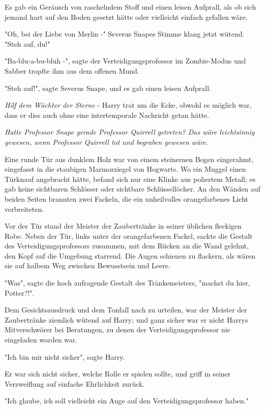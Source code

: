 {Es gab ein Geräusch von raschelndem Stoff und einen leisen Aufprall, als ob sich jemand hart auf den Boden gesetzt hätte oder vielleicht einfach gefallen wäre.

"Oh, bei der Liebe von Merlin -" Severus Snapes Stimme klang jetzt wütend. "Steh auf, du!"

"Ba-blu-a-bu-bluh -", sagte der Verteidigungsprofessor im Zombie-Modus und Sabber tropfte ihm aus dem offenen Mund.

"Steh auf!", sagte Severus Snape, und es gab einen leisen Aufprall.

\emph{Hilf dem Wächter der Sterne} - Harry trat um die Ecke, obwohl es möglich war, dass er dies auch ohne eine intertemporale Nachricht getan hätte.

\emph{Hatte Professor Snape gerade Professor Quirrell getreten? Das wäre leichtsinnig gewesen, wenn Professor Quirrell tot und begraben gewesen wäre.}

Eine runde Tür aus dunklem Holz war von einem steinernen Bogen eingerahmt, eingefasst in die staubigen Marmorziegel von Hogwarts. Wo ein Muggel einen Türknauf angebracht hätte, befand sich nur eine Klinke aus poliertem Metall; es gab keine sichtbaren Schlösser oder sichtbare Schlüssellöcher. An den Wänden auf beiden Seiten brannten zwei Fackeln, die ein unheilvolles orangefarbenes Licht verbreiteten.

Vor der Tür stand der Meister der Zaubertränke in seiner üblichen fleckigen Robe. Neben der Tür, links unter der orangefarbenen Fackel, sackte die Gestalt des Verteidigungsprofessors zusammen, mit dem Rücken an die Wand gelehnt, den Kopf auf die Umgebung starrend. Die Augen schienen zu flackern, als wären sie auf halbem Weg zwischen Bewusstsein und Leere.

"Was", sagte die hoch aufragende Gestalt des Tränkemeisters, "machst du hier, Potter?!".

Dem Gesichtsausdruck und dem Tonfall nach zu urteilen, war der Meister der Zaubertränke ziemlich wütend auf Harry; und ganz sicher war er nicht Harrys Mitverschwörer bei Beratungen, zu denen der Verteidigungsprofessor nie eingeladen worden war.

"Ich bin mir nicht sicher", sagte Harry.

Er war sich nicht sicher, welche Rolle er spielen sollte, und griff in seiner Verzweiflung auf einfache Ehrlichkeit zurück.

"Ich glaube, ich soll vielleicht ein Auge auf den Verteidigungsprofessor haben."

}
